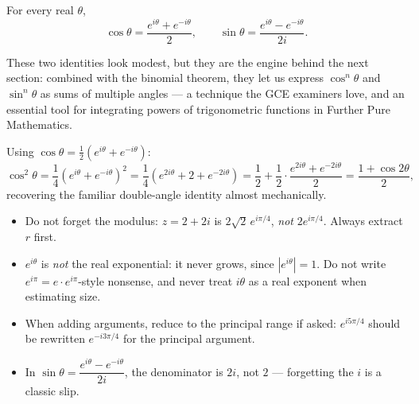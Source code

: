 \documentclass[11pt]{article}
\begin{document}
\begin{propriete}
For every real $\theta$,
\[ \cos\theta = \frac{e^{i\theta} + e^{-i\theta}}{2}, \qquad \sin\theta = \frac{e^{i\theta} - e^{-i\theta}}{2i}. \]
\end{propriete}

These two identities look modest, but they are the engine behind the next section: combined with the binomial theorem, they let us express $\cos^n\theta$ and $\sin^n\theta$ as sums of multiple angles — a technique the GCE examiners love, and an essential tool for integrating powers of trigonometric functions in Further Pure Mathematics.

\begin{exemplebox}
Using $\cos\theta = \tfrac{1}{2}\left(e^{i\theta} + e^{-i\theta}\right)$:
\[ \cos^2\theta = \frac{1}{4}\left(e^{i\theta} + e^{-i\theta}\right)^2 = \frac{1}{4}\left(e^{2i\theta} + 2 + e^{-2i\theta}\right) = \frac{1}{2} + \frac{1}{2}\cdot\frac{e^{2i\theta} + e^{-2i\theta}}{2} = \frac{1 + \cos 2\theta}{2}, \]
recovering the familiar double-angle identity almost mechanically.
\end{exemplebox}

\begin{attention}
\begin{itemize}
\item Do not forget the modulus: $z = 2 + 2i$ is $2\sqrt{2}\,e^{i\pi/4}$, \emph{not} $2e^{i\pi/4}$. Always extract $r$ first.
\item $e^{i\theta}$ is \emph{not} the real exponential: it never grows, since $|e^{i\theta}| = 1$. Do not write $e^{i\pi} = e \cdot e^{i\pi}$-style nonsense, and never treat $i\theta$ as a real exponent when estimating size.
\item When adding arguments, reduce to the principal range if asked: $e^{i5\pi/4}$ should be rewritten $e^{-i3\pi/4}$ for the principal argument.
\item In $\sin\theta = \dfrac{e^{i\theta} - e^{-i\theta}}{2i}$, the denominator is $2i$, not $2$ — forgetting the $i$ is a classic slip.
\end{itemize}
\end{attention}
\end{document}
